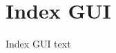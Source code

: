 

\section{Index GUI}\fbeg{}\begin{frame}{}

{\fontsize{20}{23}\selectfont

Index GUI text

}

\end{frame}



